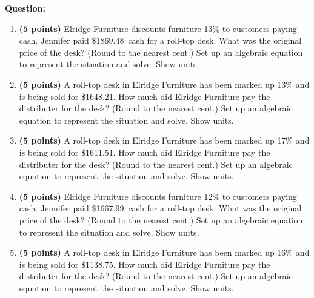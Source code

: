 \documentclass[12pt]{amsart}
\begin{document}
\graphicspath{{C:/Users/iainc/anaconda3/Randomizer/Sample Course/Sample Assessment/}}{\bf Question:} \begin{enumerate}\def \discount{13}\def \paid{1869.48}\def \rainy{13.69}\def \orcost{2148.83}\def \purcost{1654.41}\def \orrainy{15.74}
\item {\bf (5 points)} 
 Elridge Furniture discounts furniture \discount\% to customers paying cash. Jennifer paid \$\paid\ cash for a roll-top desk. What was the original price of the desk? (Round to the nearest cent.) Set up an algebraic equation to represent the situation and solve. Show units.

\vfill 
\def \discount{13}\def \paid{1648.21}\def \rainy{8.81}\def \orcost{1894.49}\def \purcost{1458.59}\def \orrainy{10.13}
\item {\bf (5 points)} 
 A roll-top desk in Elridge Furniture has been marked up \discount\% and is being sold for \$\paid. How much did Elridge Furniture pay the distributer for the desk? (Round to the nearest cent.) Set up an algebraic equation to represent the situation and solve. Show units.

\vfill 
\def \discount{17}\def \paid{1611.51}\def \rainy{10.14}\def \orcost{1941.58}\def \purcost{1377.36}\def \orrainy{12.22}
\item {\bf (5 points)} 
 A roll-top desk in Elridge Furniture has been marked up \discount\% and is being sold for \$\paid. How much did Elridge Furniture pay the distributer for the desk? (Round to the nearest cent.) Set up an algebraic equation to represent the situation and solve. Show units.

\vfill 
\def \discount{12}\def \paid{1667.99}\def \rainy{14.11}\def \orcost{1895.44}\def \purcost{1489.28}\def \orrainy{16.03}
\item {\bf (5 points)} 
 Elridge Furniture discounts furniture \discount\% to customers paying cash. Jennifer paid \$\paid\ cash for a roll-top desk. What was the original price of the desk? (Round to the nearest cent.) Set up an algebraic equation to represent the situation and solve. Show units.

\vfill 
\def \discount{16}\def \paid{1138.75}\def \rainy{12.93}\def \orcost{1355.65}\def \purcost{981.68}\def \orrainy{15.39}
\item {\bf (5 points)} 
 A roll-top desk in Elridge Furniture has been marked up \discount\% and is being sold for \$\paid. How much did Elridge Furniture pay the distributer for the desk? (Round to the nearest cent.) Set up an algebraic equation to represent the situation and solve. Show units.


\end{enumerate}
\end{document}
